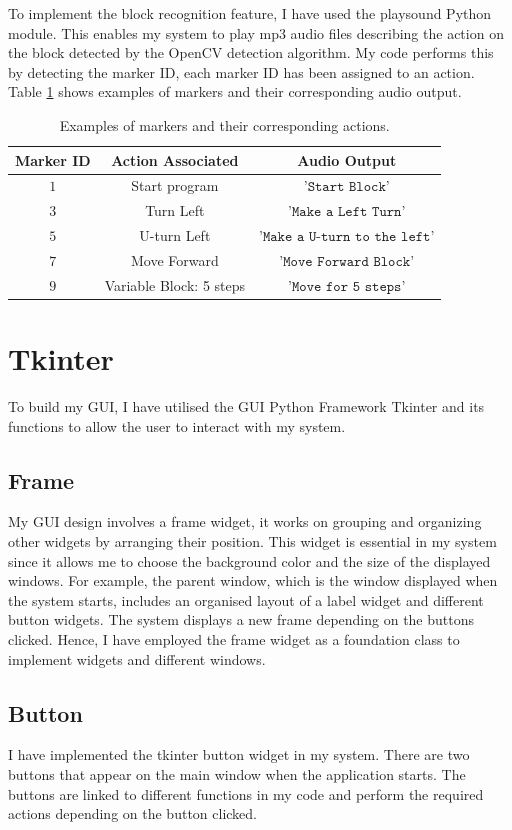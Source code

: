 \documentclass[oneside,%
                    author={Malak Hajji},
                    degree={BSc},
                    title={Designing An Accessible Computational Toolkit For Students},
                  subtitle={With Mixed Visual Abilities}]{dissertation}
\begin{document}
To implement the block recognition feature, I have used the playsound Python module. This enables my system to play mp3 audio files describing the action on the block detected by the OpenCV detection algorithm. My code performs this by detecting the marker ID, each marker ID has been assigned to an action. Table \ref{tab-sound} shows examples of markers and their corresponding audio output.
\FloatBarrier
\begin{table}[h]
\centering
\begin{tabular}{|c|c|c|}
\hline
Marker ID      & Action Associated      & Audio Output      \\
\hline
$1     $ & Start program  & $\texttt{'Start Block'}   $ \\
$3     $ & Turn Left      & $\texttt{'Make a Left Turn'}   $ \\
$5     $ &U-turn Left& $ \texttt{'Make a U-turn to the left'} $\\
$7     $ & Move Forward & $\texttt{'Move Forward Block'}   $ \\
$9     $ & Variable Block: 5 steps   & $\texttt{'Move for 5 steps'} $ \\
\hline
\end{tabular}
\caption{Examples of markers and their corresponding actions.}
\label{tab-sound}
\end{table}
\FloatBarrier
\section{Tkinter}

To build my GUI, I have utilised the GUI Python Framework Tkinter and its functions to allow the user to interact with my system.

\subsection{Frame}
My GUI design involves a frame widget, it works on grouping and organizing other widgets by arranging their position. This widget is essential in my system since it allows me to choose the background color and the size of the displayed windows. For example, the parent window, which is the window displayed when the system starts, includes an organised layout of a label widget and different button widgets. The system displays a new frame depending on the buttons clicked. Hence, I have employed the frame widget as a foundation class to implement widgets and different windows.

\subsection{Button}
I have implemented the tkinter button widget in my system. There are two buttons that appear on the main window when the application starts. The buttons are linked to different functions in my code and perform the required actions depending on the button clicked.
\end{document}
